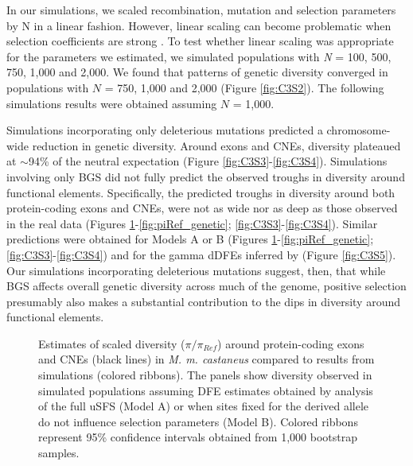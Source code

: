	In our simulations, we scaled recombination, mutation and selection parameters by N in a linear fashion. However, linear scaling can become problematic when selection coefficients are strong \citep{RN198}. To test whether linear scaling was appropriate for the parameters we estimated, we simulated populations with \textit{N} = 100, 500, 750, 1,000 and 2,000. We found that patterns of genetic diversity converged in populations with $N$ = 750, 1,000 and 2,000 (Figure \ref{fig:C3S2}). The following simulations results were obtained assuming $N$ = 1,000. 


	Simulations incorporating only deleterious mutations predicted a chromosome-wide reduction in genetic diversity. Around exons and CNEs, diversity plateaued at $\sim$94\% of the neutral expectation (Figure \ref{fig:C3S3}-\ref{fig:C3S4}). Simulations involving only BGS did not fully predict the observed troughs in diversity around functional elements. Specifically, the predicted troughs in diversity around both protein-coding exons and CNEs, were not as wide nor as deep as those observed in the real data (Figures \ref{fig:piRef_physical}-\ref{fig:piRef_genetic}; \ref{fig:C3S3}-\ref{fig:C3S4}). Similar predictions were obtained for Models A or B (Figures \ref{fig:piRef_physical}-\ref{fig:piRef_genetic}; \ref{fig:C3S3}-\ref{fig:C3S4}) and for the gamma dDFEs inferred by \cite{RN122} (Figure \ref{fig:C3S5}). Our simulations incorporating deleterious mutations suggest, then, that while BGS affects overall genetic diversity across much of the genome, positive selection presumably also makes a substantial contribution to the dips in diversity around functional elements.
	
 \begin{figure}[H]
   \centering      
   \noindent{}
 \caption[Reductions in diversity caused by background selection and selective sweeps in simulated data - physical distance]{Estimates of scaled diversity ($\pi / \pi_{Ref}$) around protein-coding exons and CNEs (black lines) in \textit{M. m. castaneus} compared to results from simulations (colored ribbons). The panels show diversity observed in simulated populations assuming DFE estimates obtained by analysis of the full uSFS (Model A) or when sites fixed for the derived allele do not influence selection parameters (Model B). Colored ribbons represent 95\% confidence intervals obtained from 1,000 bootstrap samples.}
 \label{fig:piRef_physical}
\end{figure}

